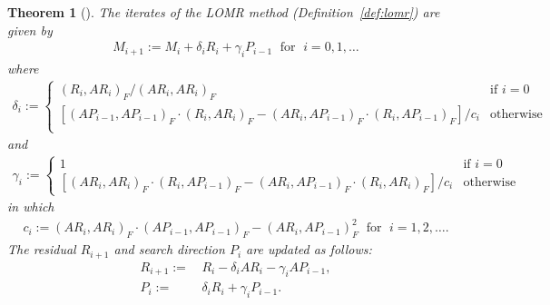 \documentclass[numbers,webpdf,imanum]{ima-authoring-template}%
\theoremstyle{thmstyletwo}%
\newtheorem{theorem}{Theorem}%
\numberwithin{equation}{section}
\begin{document}
\begin{theorem}[]\label{theo:lomr-iterates}
The iterates of the LOMR method (Definition~\ref{def:lomr}) are given by
\begin{align}\label{eq:615}
M_{i+1}:=M_i+\delta_iR_i+\gamma_iP_{i-1}
\;\text{ for }\;
i=0,1,\dots
\end{align}
where
\begin{align}\label{eq:620}
\delta_i:=
\begin{cases}
(R_i,AR_i)_F/(AR_i,AR_i)_F&\text{if }i=0\\
[(AP_{i-1},AP_{i-1})_F\cdot(R_i,AR_i)_F-(AR_i,AP_{i-1})_F\cdot(R_i,AP_{i-1})_F]/c_i&\text{otherwise}\\
\end{cases}
\end{align}
and
\begin{align}\label{eq:625}
\gamma_i:=
\begin{cases}
1&\text{if }i=0\\
[(AR_i,AR_i)_F\cdot(R_i,AP_{i-1})_F-(AR_i,AP_{i-1})_F\cdot(R_i,AR_i)_F]/c_i&\text{otherwise}
\end{cases}
\end{align}
in which
\begin{align}\label{eq:630}
c_i:=(AR_i,AR_i)_F\cdot(AP_{i-1},AP_{i-1})_F-(AR_i,AP_{i-1})_F^2
\;\text{ for }\;i=1,2,\dots.
\end{align}
The residual $R_{i+1}$ and search direction $P_i$ are updated as follows:
\begin{align}\label{eq:635}
R_{i+1}:=&\,R_i-\delta_iAR_i-\gamma_iAP_{i-1},\\
P_i:=&\,\delta_iR_i+\gamma_iP_{i-1}.\label{eq:637}
\end{align}
\end{theorem}
\end{document}
